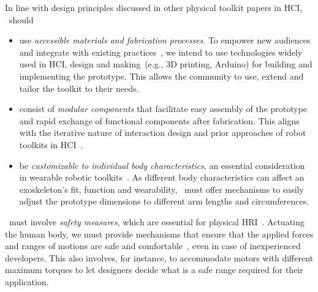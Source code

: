 In line with design principles discussed in other physical toolkit papers in HCI, \toolkit~should
\begin{itemize}[leftmargin=*, noitemsep, topsep=3pt]
\item use \textit{accessible materials and fabrication processes}. To empower new audiences and  integrate with existing practices~\cite{ledo_2018}, we intend to use technologies widely used in HCI, design and making~(e.g., 3D printing, Arduino) for building and implementing the prototype. This allows the community to use, extend and tailor the toolkit to their needs.
\item consist of \textit{modular components} that facilitate easy assembly of the prototype and rapid exchange of functional components after fabrication. This aligns with the iterative nature of interaction design and prior approaches of robot toolkits in HCI~\cite{cui_2023,cui_2024}.
\item be \textit{customizable to individual body characteristics}, an essential consideration in wearable robotic toolkits~\cite{saberpour_2023}. As different body characteristics can affect an exoskeleton's fit, function and wearability, \toolkit~must offer mechanisms to easily adjust the prototype dimensions to different arm lengths and circumferences. 
\end{itemize}

\toolkit~must involve \textit{safety measures}, which are essential for physical HRI~\cite{desantis_2008, saberpour_2023}. Actuating the human body, we must provide mechanisms that ensure that the applied forces and ranges of motions are safe and comfortable~\cite{souza_2016}, even in case of inexperienced developers.  This also involves, for instance, to accommodate motors with different maximum torques to let designers decide what is a safe range required for their application. 